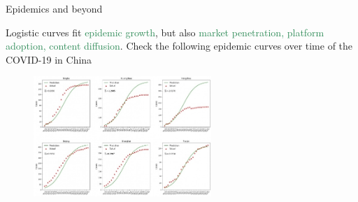 \documentclass[11pt,aspectratio=169]{beamer}
\begin{document}
\begin{frame}{Epidemics and beyond}

Logistic curves fit \textcolor{SeaGreen}{epidemic growth}, but also \textcolor{SeaGreen}{market penetration, platform adoption, content diffusion}. Check the following epidemic curves over time of the COVID-19 in China

\begin{figure}
\includegraphics[width=0.60\textwidth]{img/figure}
\end{figure}
\end{frame}
\end{document}
